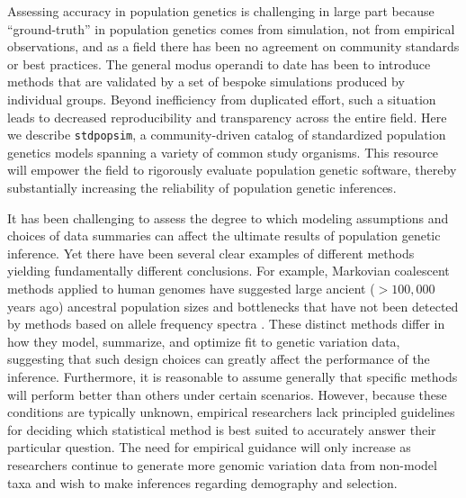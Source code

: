 \documentclass[12pt,halfline,a4paper]{ouparticle}
\newcommand{\stdpopsim}{\texttt{stdpopsim}\xspace}
\begin{document}
Assessing accuracy in population genetics is challenging in large part because
 ``ground-truth'' in population genetics comes from simulation,
not from empirical observations, and as a field there has been no agreement
on community standards or best practices. The general modus operandi to date has been to
introduce methods that are validated by a set of bespoke simulations produced by individual
groups. Beyond inefficiency from duplicated effort, such a situation leads
to decreased reproducibility and transparency across the entire field.
Here we describe \stdpopsim, a community-driven catalog
of standardized population genetics models spanning a variety of common study organisms.
This resource will empower the field to rigorously evaluate population genetic software,
thereby substantially increasing the reliability of population genetic inferences.

It has been challenging to assess the degree to which modeling assumptions
and choices of data summaries can affect the ultimate results of population
genetic inference. Yet there
have been several clear examples of different methods yielding fundamentally
different conclusions. For example, Markovian coalescent methods applied to human genomes have
suggested large ancient ($>100,000$ years ago) ancestral population sizes and
bottlenecks that have not been detected by methods based on allele frequency spectra
\citep[see][]{beichman2017comparison}.
These distinct methods differ in how they model, summarize, and optimize fit to
genetic variation data, suggesting that such design choices can greatly affect the
performance of the inference. Furthermore, it is reasonable
to assume generally that specific methods will perform better than others under certain scenarios.
However, because these conditions are typically unknown, empirical researchers
lack principled guidelines for deciding which statistical method is best suited
to accurately answer their particular question. The need for empirical
guidance will only increase as researchers continue to generate more genomic
variation data from non-model taxa and wish to make inferences regarding
demography and selection.
\end{document}
